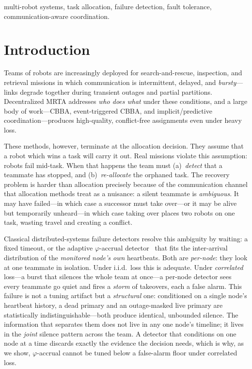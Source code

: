 \documentclass[conference]{IEEEtran}
\begin{document}
\begin{IEEEkeywords}
multi-robot systems, task allocation, failure detection, fault tolerance,
communication-aware coordination.
\end{IEEEkeywords}

\section{Introduction}
Teams of robots are increasingly deployed for search-and-rescue, inspection,
and retrieval missions in which communication is intermittent, delayed, and
\emph{bursty}---links degrade together during transient outages and partial
partitions. Decentralized MRTA addresses \emph{who does what} under these
conditions, and a large body of work---CBBA, event-triggered CBBA, and
implicit/predictive coordination---produces high-quality, conflict-free
assignments even under heavy loss.

These methods, however, terminate at the allocation decision. They assume that
a robot which wins a task will carry it out. Real missions violate this
assumption: robots fail mid-task. When that happens the team must (a)~\emph{detect}
that a teammate has stopped, and (b)~\emph{re-allocate} the orphaned task. The
recovery problem is harder than allocation precisely because of the
communication channel that allocation methods treat as a nuisance: a silent
teammate is \emph{ambiguous}. It may have failed---in which case a successor
must take over---or it may be alive but temporarily unheard---in which case
taking over places two robots on one task, wasting travel and creating a
conflict.

Classical distributed-systems failure detectors resolve this ambiguity by
waiting: a fixed timeout, or the adaptive $\varphi$-accrual
detector~\cite{phiaccrual} that fits the inter-arrival distribution of the
\emph{monitored node's own} heartbeats. Both are \emph{per-node}: they look at
one teammate in isolation. Under i.i.d.\ loss this is adequate. Under
\emph{correlated} loss---a burst that silences the whole team at once---a
per-node detector sees every teammate go quiet and fires a \emph{storm} of
takeovers, each a false alarm. This failure is not a tuning artifact but a
\emph{structural} one: conditioned on a single node's heartbeat history, a dead
primary and an outage-masked live primary are statistically
indistinguishable---both produce identical, unbounded silence. The information
that separates them does not live in any one node's timeline; it lives in the
\emph{joint} silence pattern across the team. A detector that conditions on one
node at a time discards exactly the evidence the decision needs, which is why,
as we show, $\varphi$-accrual cannot be tuned below a false-alarm floor under
correlated loss.
\end{document}
